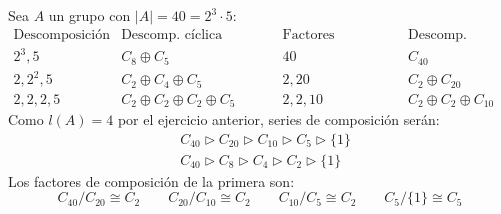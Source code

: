 \begin{ejemplo} %
    Sea $A$ un grupo con $|A| = 40 = 2^3\cdot 5$:
    \begin{equation*}
        \begin{array}{c|c|c|c}
                \text{Descomposición} & \text{Descomp. cíclica primaria} & \text{Factores invariantes} & \text{Descomp. cíclica} \\
                \hline
                2^3, 5 & C_8 \oplus C_5 & 40 & C_{40} \\
                2, 2^2, 5 & C_2 \oplus C_4 \oplus C_5 & 2, 20 & C_2 \oplus C_{20} \\
                2, 2, 2, 5 & C_2 \oplus C_2 \oplus C_2 \oplus C_5 & 2, 2, 10 & C_2 \oplus C_2\oplus C_{10}
        \end{array}
    \end{equation*}
    Como $l(A) = 4$ por el ejercicio anterior, series de composición serán:
    \begin{align*}
        &C_{40} \rhd C_{20} \rhd C_{10} \rhd C_5 \rhd \{1\} \\
        &C_{40} \rhd C_{8} \rhd C_{4} \rhd C_2 \rhd \{1\} 
    \end{align*}
    Los factores de composición de la primera son:
    \begin{equation*}
        C_{40}/C_{20} \cong C_2 \qquad C_{20}/C_{10}\cong C_2 \qquad C_{10}/C_5\cong C_2 \qquad C_5/\{1\}\cong C_5
    \end{equation*}
\end{ejemplo}

